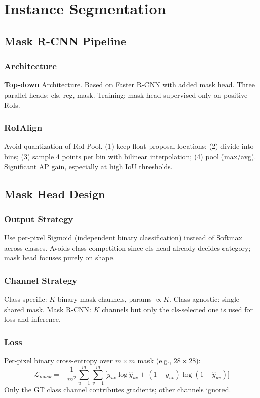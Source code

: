 \section{Instance Segmentation}
\subsection{Mask R-CNN Pipeline}
\subsubsection*{Architecture}
\textbf{Top-down} Architecture. Based on Faster R-CNN with added mask head. Three parallel heads: cls, reg, mask.
Training: mask head supervised only on positive RoIs.

\subsubsection*{RoIAlign}
Avoid quantization of RoI Pool.
(1) keep float proposal locations;
(2) divide into bins;
(3) sample 4 points per bin with bilinear interpolation;
(4) pool (max/avg).
Significant AP gain, especially at high IoU thresholds.

\subsection{Mask Head Design}
\subsubsection*{Output Strategy}
Use per-pixel Sigmoid (independent binary classification) instead of Softmax across classes.
Avoids class competition since cls head already decides category; mask head focuses purely on shape.

\subsubsection*{Channel Strategy}
Class-specific: $K$ binary mask channels, params $\propto K$. Class-agnostic: single shared mask.
Mask R-CNN: $K$ channels but only the cls-selected one is used for loss and inference.

\subsubsection*{Loss}
Per-pixel binary cross-entropy over $m\times m$ mask (e.g., $28\times28$):
\[
\mathcal{L}_{mask}=-\frac{1}{m^2}\sum_{u=1}^m\sum_{v=1}^m\bigl[y_{uv}\log\hat y_{uv}+(1-y_{uv})\log(1-\hat y_{uv})\bigr]
\]
Only the GT class channel contributes gradients; other channels ignored.
